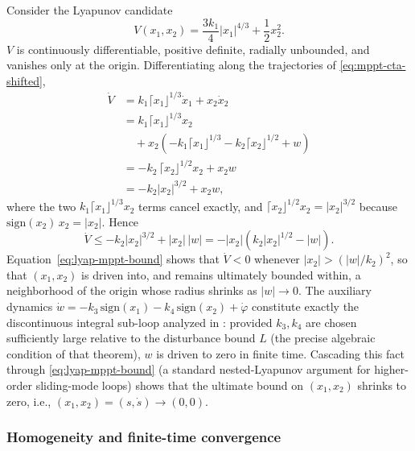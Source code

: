 \documentclass[preprint,12pt]{elsarticle}
\begin{document}
Consider the Lyapunov candidate
\begin{equation}
    V(x_1,x_2) = \frac{3k_1}{4}|x_1|^{4/3} + \frac{1}{2}x_2^2 .
    \label{eq:lyap-mppt}
\end{equation}
$V$ is continuously differentiable, positive definite, radially unbounded, and vanishes only at the origin. Differentiating along the trajectories of \eqref{eq:mppt-cta-shifted},
\begin{equation}
\begin{aligned}
    \dot{V} &= k_1 \lceil x_1 \rfloor^{1/3} \dot{x}_1 + x_2 \dot{x}_2 \\
            &= k_1 \lceil x_1 \rfloor^{1/3} x_2 \\
            & \quad + x_2\left(-k_1 \lceil x_1 \rfloor^{1/3} - k_2 \lceil x_2 \rfloor^{1/2} + w\right) \\
            &= -k_2\,\lceil x_2 \rfloor^{1/2} x_2 + x_2 w \\
            &= -k_2 |x_2|^{3/2} + x_2 w,
\end{aligned}
\label{eq:lyap-mppt-derivative}
\end{equation}
where the two $k_1\lceil x_1\rfloor^{1/3}x_2$ terms cancel exactly, and $\lceil x_2\rfloor^{1/2}x_2 = |x_2|^{3/2}$ because $\mathrm{sign}(x_2)\,x_2=|x_2|$. Hence
\begin{equation}
    \dot{V} \leq -k_2|x_2|^{3/2} + |x_2|\,|w| = -|x_2|\left(k_2|x_2|^{1/2} - |w|\right).
    \label{eq:lyap-mppt-bound}
\end{equation}
Equation~\eqref{eq:lyap-mppt-bound} shows that $\dot V < 0$ whenever $|x_2| > (|w|/k_2)^2$, so that $(x_1,x_2)$ is driven into, and remains ultimately bounded within, a neighborhood of the origin whose radius shrinks as $|w|\to 0$. The auxiliary dynamics $\dot w = -k_3\,\mathrm{sign}(x_1) - k_4\,\mathrm{sign}(x_2) + \dot\varphi$ constitute exactly the discontinuous integral sub-loop analyzed in \cite[Thm. ~1]{torres2017design}: provided $k_3, k_4$ are chosen sufficiently large relative to the disturbance bound $L$ (the precise algebraic condition of that theorem), $w$ is driven to zero in finite time. Cascading this fact through \eqref{eq:lyap-mppt-bound} (a standard nested-Lyapunov argument for higher-order sliding-mode loops) shows that the ultimate bound on $(x_1,x_2)$ shrinks to zero, i.e., $(x_1,x_2)=(s,\dot s) \to (0,0)$.

\subsubsection{Homogeneity and finite-time convergence}
\label{subsubsec:homogeneity}
\end{document}
